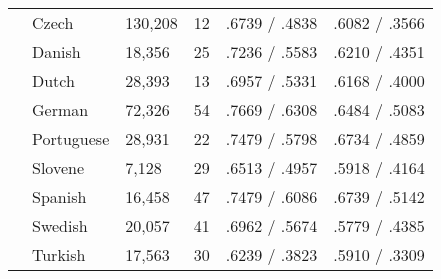 \begin{table*}[ht]
\begin{tabular}{|l|l|l|l|l|l|}
        & Czech      & 130,208 & 12 & .6739 / .4838 & .6082 / .3566\\
        & Danish     & 18,356  & 25 & .7236 / .5583 & .6210 / .4351\\
        & Dutch      & 28,393  & 13 & .6957 / .5331 & .6168 / .4000\\
        & German     & 72,326  & 54 & .7669 / .6308 & .6484 / .5083\\
        & Portuguese & 28,931  & 22 & .7479 / .5798 & .6734 / .4859\\
        & Slovene    & 7,128   & 29 & .6513 / .4957 & .5918 / .4164\\
        & Spanish    & 16,458  & 47 & .7479 / .6086 & .6739 / .5142\\
        & Swedish    & 20,057  & 41 & .6962 / .5674 & .5779 / .4385\\
        & Turkish    & 17,563  & 30 & .6239 / .3823 & .5910 / .3309\\ \hline
    \end{tabular}
  \label{tab:multiresults}
\end{table*}
